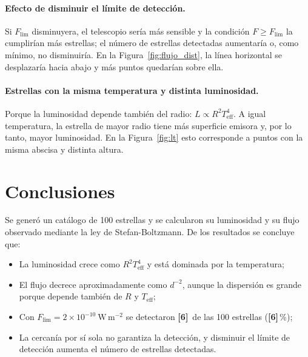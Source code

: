 \documentclass[11pt,a4paper]{article}
\newcommand{\Ndet}{\textbf{[6]}}        %
\newcommand{\Pdet}{\textbf{[6]}}        %
\begin{document}
\paragraph{Efecto de disminuir el límite de detección.}
Si $F_{\mathrm{lim}}$ disminuyera, el telescopio sería más sensible y la condición $F \geq F_{\mathrm{lim}}$ la cumplirían más estrellas; el número de estrellas detectadas aumentaría o, como mínimo, no disminuiría. En la Figura~\ref{fig:flujo_dist}, la línea horizontal se desplazaría hacia abajo y más puntos quedarían sobre ella.

\paragraph{Estrellas con la misma temperatura y distinta luminosidad.}
Porque la luminosidad depende también del radio: $L \propto R^{2}T_{\mathrm{eff}}^{4}$. A igual temperatura, la estrella de mayor radio tiene más superficie emisora y, por lo tanto, mayor luminosidad. En la Figura~\ref{fig:lt} esto corresponde a puntos con la misma abscisa y distinta altura.

\section{Conclusiones}
Se generó un catálogo de 100 estrellas y se calcularon su luminosidad y su flujo observado
mediante la ley de Stefan-Boltzmann. De los resultados se concluye que:
\begin{itemize}
  \item La luminosidad crece como $R^{2}T_{\mathrm{eff}}^{4}$ y está dominada por la temperatura;
  \item El flujo decrece aproximadamente como $d^{-2}$, aunque la dispersión es grande porque depende también de $R$ y $T_{\mathrm{eff}}$;
  \item Con $F_{\mathrm{lim}} = 2\times10^{-10}\ \mathrm{W\,m^{-2}}$ se detectaron \Ndet\ de las 100 estrellas (\Pdet\,\%);
  \item La cercanía por sí sola no garantiza la detección, y disminuir el límite de
        detección aumenta el número de estrellas detectadas.
\end{itemize}
\end{document}
